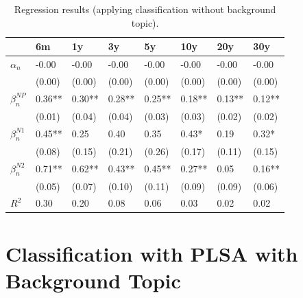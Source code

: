\documentclass[11pt,a4paper,english,oneside]{book}
\numberwithin{equation}{chapter}
\begin{document}
\begin{table}[h] %
	\centering %
	\begin{tabular}{ p{2cm}  p{1cm} p{1cm} p{1cm} p{1cm} p{1cm} p{1cm} p{1cm} } %
		\toprule %
		& 6m & 1y & 3y & 5y & 10y & 20y & 30y \\
		\midrule %
		$\alpha_n$		& -0.00 	& -0.00 	& -0.00 	& -0.00  	& -0.00 	& -0.00 	& -0.00    \\
						& (0.00) 	& (0.00)  	& (0.00)  	& (0.00) 	& (0.00) 	& (0.00) 	&  (0.00)   \\
		$\beta_n^{NP}$	& 0.36** 	& 0.30**   	& 0.28** 	& 0.25** 	& 0.18** 	& 0.13** 	& 0.12**  \\
						& (0.01) 	& (0.04) 	& (0.04) 	& (0.03) 	& (0.03)  	& (0.02) 	& (0.02)    \\
		$\beta_n^{N1}$	& 0.45** 	& 0.25 		&   0.40 	& 0.35 		& 0.43*  	& 0.19 		& 0.32*  \\
						& (0.08) 	& (0.15) 	& (0.21) 	& (0.26) 	& (0.17)  	& (0.11) 	& (0.15)   \\
		$\beta_n^{N2}$	& 0.71** 	& 0.62**   	&0.43**  	& 0.45** 	& 0.27** 	& 0.05		& 0.16**\\
						& (0.05)	& (0.07) 	& (0.10) 	& (0.11) 	& (0.09)	& (0.09)	& (0.06)   \\
		$R^2$			& 0.30 		& 0.20 		& 0.08 		& 0.06 		& 0.03 		&  0.02		& 0.02    \\
		
		\bottomrule %
	\end{tabular}
	\caption{Regression results (applying classification without background topic).} %
	\label{tab:reg1} %
\end{table}

\section{Classification with PLSA with Background Topic}
\end{document}
